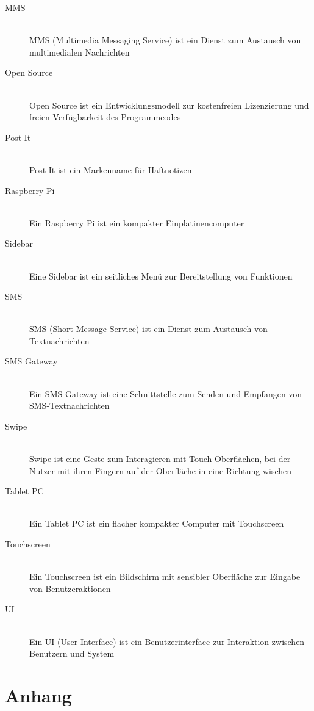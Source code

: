 \begin{description}
  \item[MMS] \hfill \\
    MMS (Multimedia Messaging Service) ist ein Dienst zum Austausch von multimedialen Nachrichten
  \item[Open Source] \hfill \\
    Open Source ist ein Entwicklungsmodell zur kostenfreien Lizenzierung und freien Verfügbarkeit des Programmcodes
  \item[Post-It] \hfill \\
    Post-It ist ein Markenname für Haftnotizen
  \item[Raspberry Pi] \hfill \\
    Ein Raspberry Pi ist ein kompakter Einplatinencomputer
  \item[Sidebar] \hfill \\
    Eine Sidebar ist ein seitliches Menü zur Bereitstellung von Funktionen
  \item[SMS] \hfill \\
    SMS (Short Message Service) ist ein Dienst zum Austausch von Textnachrichten
  \item[SMS Gateway] \hfill \\
    Ein SMS Gateway ist eine Schnittstelle zum Senden und Empfangen von SMS-Textnachrichten
  \item[Swipe] \hfill \\
    Swipe ist eine Geste zum Interagieren mit Touch-Oberflächen, bei der Nutzer mit ihren Fingern auf der Oberfläche in eine Richtung wischen
  \item[Tablet PC] \hfill \\
    Ein Tablet PC ist ein flacher kompakter Computer mit Touchscreen
  \item[Touchscreen] \hfill \\
    Ein Touchscreen ist ein Bildschirm mit sensibler Oberfläche zur Eingabe von Benutzeraktionen
  \item[UI] \hfill \\
    Ein UI (User Interface) ist ein Benutzerinterface zur Interaktion zwischen Benutzern und System
\end{description}

\chapter*{Anhang}\label{Anhang}
